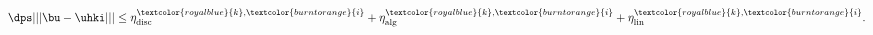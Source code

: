 \documentclass[10 pt]{beamer}
\begin{document}
\begin{frame}
\begin{theorem}
\emph{
\textcolor{bulgarianrose}{
\begin{equation*}
\dps
|||\bu-\uhki||| \leq \eta^{\textcolor{royalblue}{k},\textcolor{burntorange}{i}}_{\mathrm{disc}} +\eta^{\textcolor{royalblue}{k},\textcolor{burntorange}{i}}_{\mathrm{alg}} + \eta^{\textcolor{royalblue}{k},\textcolor{burntorange}{i}}_{\mathrm{lin}}.
\end{equation*}
}}
\end{theorem}
\end{frame}



\end{document}
